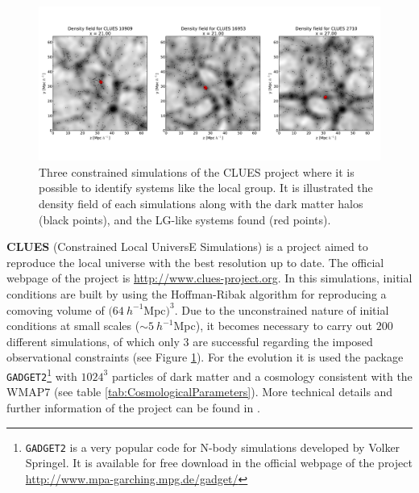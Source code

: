 \begin{figure}[htbp]
	\centering
	\includegraphics[width=1.0\textwidth]
	{./figures/3_nbody_simulations/CLUES_Simulations.pdf}

	\caption{\small{Three constrained simulations of the CLUES project 
	where it is possible to identify systems like the local group. It is
	illustrated the density field of each simulations along with the dark
	matter halos (black points), and the LG-like systems found (red 
	points).}}
	
	\label{fig:CLUES_Right}
\end{figure}


\textbf{CLUES} (Constrained Local UniversE Simulations) is a project aimed
to reproduce the local universe with the best resolution up to date. The 
official webpage of the project is \url{http://www.clues-project.org}. In 
this simulations, initial conditions are built by using the Hoffman-Ribak
algorithm \cite{Hoffman1991} for reproducing a comoving volume of $(64\ 
h^{-1}$Mpc$)^{3}$. Due to the unconstrained nature of initial conditions at
small scales ($\sim 5\ h^{-1}$Mpc), it becomes necessary to carry out $200$
different simulations, of which only $3$ are successful regarding the 
imposed observational constraints (see Figure \ref{fig:CLUES_Right}).
For the evolution it is used the package \texttt{GADGET2}\footnote{
\texttt{GADGET2} is a very popular code for N-body simulations developed
by Volker Springel. It is available for free download in the official 
webpage of the project \url{http://www.mpa-garching.mpg.de/gadget/}}
with $1024^3$ particles of dark matter and a cosmology consistent with
the WMAP7 (see table \ref{tab:CosmologicalParameters}). More technical 
details  and further information of the project can be found in
\cite{Gottloeber2010}.


